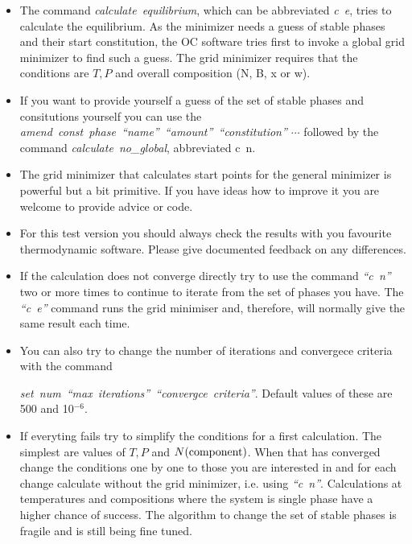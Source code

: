 \documentclass[12pt]{article}
\begin{document}
\begin{itemize}
\item The command {\em calculate~equilibrium}, which can be
  abbreviated {\em c~e}, tries to calculate the equilibrium.  As the
  minimizer needs a guess of stable phases and their start
  constitution, the OC software tries first to invoke a global grid
  minimizer to find such a guess.  The grid minimizer requires that
  the conditions are $T, P$ and overall composition (N, B, x or w).

\item If you want to provide yourself a guess of the set of stable
  phases and consitutions yourself you can use the {\em
    amend~const~phase~``name''~``amount''~``constitution'' $\cdots$}
  followed by the command {\em calculate~no\_global}, abbreviated {\rm
    c~n}.

\item The grid minimizer that calculates start points for the general
  minimizer is powerful but a bit primitive.  If you have ideas how to
  improve it you are welcome to provide advice or code.

\item For this test version you should always check the results with
  you favourite thermodynamic software.  Please give documented
  feedback on any differences.

\item If the calculation does not converge directly try to use the
  command {\em ``c~n''} two or more times to continue to iterate from
  the set of phases you have.  The {\em ``c~e''} command runs the grid
  minimiser and, therefore, will normally give the same result each
  time.

\item You can also try to change the number of iterations and
  convergece criteria with the command

  {\em set~num~``max~iterations''~``convergce~criteria''}.  Default
  values of these are 500 and 10$^{-6}$.

\item If everyting fails try to simplify the conditions for a first
  calculation.  The simplest are values of $T, P$ and $N(\rm
  component)$. When that has converged change the conditions one by
  one to those you are interested in and for each change calculate
  without the grid minimizer, i.e.  using {\em ``c~n''}.  Calculations
  at temperatures and compositions where the system is single phase
  have a higher chance of success.  The algorithm to change the set of
  stable phases is fragile and is still being fine tuned.


\end{itemize}
\end{document}
